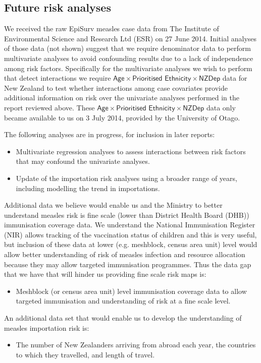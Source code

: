 \documentclass{article}
\begin{document}
\subsection{Future risk analyses}
We received the raw EpiSurv measles case data from The Institute of Environmental Science and Research Ltd (ESR) on 27 June 2014. Initial analyses of those data (not shown) suggest that we require denominator data to perform multivariate analyses to avoid confounding results due to a lack of independence among risk factors. Specifically for the multivariate analyses we wish to perform that detect interactions we require $\textsf{Age} \times \textsf{Prioritised Ethnicity} \times \textsf{NZDep}$ data for New Zealand to test whether interactions among case covariates provide additional information on risk over the univariate analyses performed in the report reviewed above. These $\textsf{Age} \times \textsf{Prioritised Ethnicity} \times \textsf{NZDep}$ data only became available to us on 3 July 2014, provided by the University of Otago.

The following analyses are in progress, for inclusion in later reports:
\begin{itemize}
\item Multivariate regression analyses to assess interactions between risk factors that may confound the univariate analyses.
\item Update of the importation risk analyses using a broader range of years, including modelling the trend in importations.
\end{itemize}
Additional data we believe would enable us and the Ministry to better understand measles risk is fine scale (lower than District Health Board (DHB)) immunisation coverage data. We understand the National Immunisation Register (NIR) allows tracking of the vaccination status of children and this is very useful, but inclusion of these data at lower (e.g. meshblock, census area unit) level would allow better understanding of risk of measles infection and resource allocation because they may allow targeted immunisation programmes. Thus the data gap that we have that will hinder us providing fine scale risk maps is:
\begin{itemize}
\item Meshblock (or census area unit) level immunisation coverage data to allow targeted immunisation and understanding of risk at a fine scale level.
\end {itemize}
An additional data set that would enable us to develop the understanding of measles importation risk is:
\begin {itemize}
\item The number of New Zealanders arriving from abroad each year, the countries to which they travelled, and length of travel.
\end{itemize}
\end{document}
